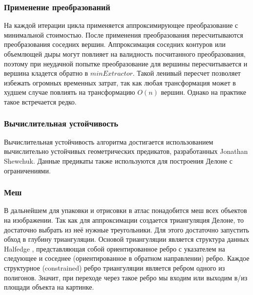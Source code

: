 \documentclass{fefu_thesis/cls/fefu}
\begin{document}
    \subsubsection{Применение преобразований}
    На каждой итерации цикла применяется аппроксимирующее преобразование с минимальной стоимостью. После применения преобразования пересчитываются преобразования соседних вершин.
    Аппроксимация соседних контуров или объемлющей дыры могут повлияет на валидность посчитанного преобразования, поэтому при неудачной попытке преобразование для вершины пересчитывается и вершина кладется обратно в $minExtractor$. Такой ленивый пересчет позволяет избежать огромных временных затрат, так как любая трансформация может в худшем случае повлиять на трансформацию $O\left(n\right)$ вершин. Однако на практике такое встречается редко.

    \subsubsection{Вычислительная устойчивость}
    Вычислительная устойчивость алгоритма достигается использованием вычислительно устойчивых геометрических предикатов, разработанных Jonathan Shewchuk\cite{shewchuk97a}. Данные предикаты также используются для построения Делоне с ограничениями.
    \subsubsection{Меш}
    В дальнейшем для упаковки и отрисовки в атлас понадобится меш всех объектов на изображении. Так как для аппроксимации создается триангуляция Делоне, то достаточно выбрать из неё нужные треугольники. Для этого достаточно запустить обход в глубину триангуляции. Основой триангуляции является структура данных Halfedge \cite{Halfedge}, представляющая собой ориентированное ребро с указателем на следующее и соседнее (ориентированное в обратном направлении) ребро. Каждое структурное (constrained) ребро триангуляции является ребром одного из полигонов. Значит, при переходе через такое ребро мы входим или выходим в/из площади объекта на картинке.
\end{document}
